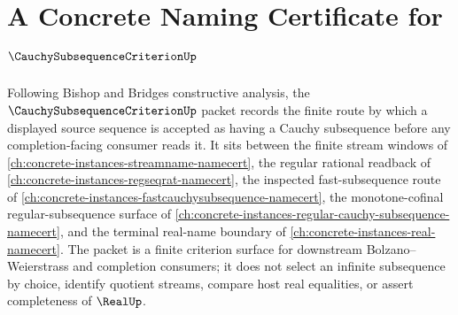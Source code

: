 \chapter{A Concrete Naming Certificate for $\CauchySubsequenceCriterionUp$}
\label{ch:concrete-instances-cauchy-subsequence-criterion-namecert}

Following Bishop and Bridges constructive analysis, the $\CauchySubsequenceCriterionUp$ packet records the finite route by which a displayed source sequence is accepted as having a Cauchy subsequence before any completion-facing consumer reads it. It sits between the finite stream windows of \autoref{ch:concrete-instances-streamname-namecert}, the regular rational readback of \autoref{ch:concrete-instances-regseqrat-namecert}, the inspected fast-subsequence route of \autoref{ch:concrete-instances-fastcauchysubsequence-namecert}, the monotone-cofinal regular-subsequence surface of \autoref{ch:concrete-instances-regular-cauchy-subsequence-namecert}, and the terminal real-name boundary of \autoref{ch:concrete-instances-real-namecert}. The packet is a finite criterion surface for downstream Bolzano--Weierstrass and completion consumers; it does not select an infinite subsequence by choice, identify quotient streams, compare host real equalities, or assert completeness of $\RealUp$.

